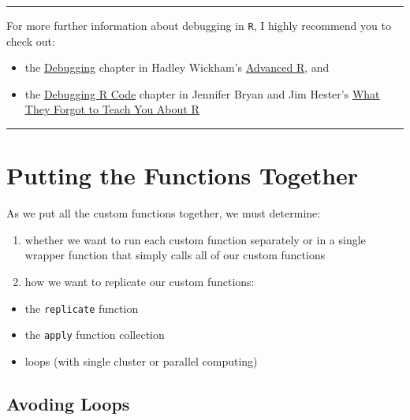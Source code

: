 \documentclass[
]{book}
\providecommand{\tightlist}{%
  \setlength{\itemsep}{0pt}\setlength{\parskip}{0pt}}
\begin{document}
\begin{center}\rule{0.5\linewidth}{\linethickness}\end{center}

For more further information about debugging in \texttt{R}, I highly recommend you to check out:

\begin{itemize}
\tightlist
\item
  the \href{https://adv-r.hadley.nz/debugging.html}{Debugging} chapter in Hadley Wickham's \href{https://adv-r.hadley.nz/}{Advanced R}, and
\item
  the \href{https://rstats.wtf/debugging-r-code.html}{Debugging R Code} chapter in Jennifer Bryan and Jim Hester's \href{https://rstats.wtf/}{What They Forgot to Teach You About R}
\end{itemize}

\begin{center}\rule{0.5\linewidth}{\linethickness}\end{center}

\hypertarget{putting-the-functions-together}{%
\section{Putting the Functions Together}\label{putting-the-functions-together}}

As we put all the custom functions together, we must determine:

\begin{enumerate}
\def\labelenumi{\arabic{enumi}.}
\tightlist
\item
  whether we want to run each custom function separately or in a single wrapper function that simply calls all of our custom functions
\item
  how we want to replicate our custom functions:
\end{enumerate}

\begin{itemize}
\tightlist
\item
  the \texttt{replicate} function
\item
  the \texttt{apply} function collection
\item
  loops (with single cluster or parallel computing)
\end{itemize}

\hypertarget{avoding-loops}{%
\subsection{Avoding Loops}\label{avoding-loops}}
\end{document}
